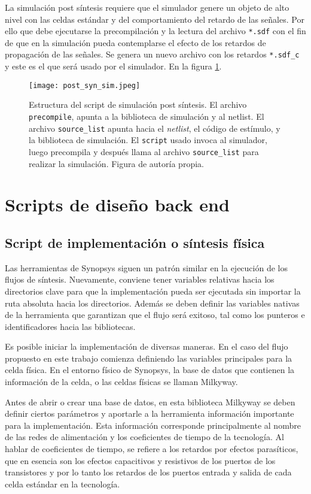 La simulación post síntesis requiere que el simulador genere un objeto de alto nivel con las celdas estándar y del comportamiento del retardo de las señales. Por ello que debe ejecutarse la precompilación y la lectura del archivo \texttt{*.sdf} con el fin de que en la simulación pueda contemplarse el efecto de los retardos de propagación de las señales. Se genera un nuevo archivo con los retardos \texttt{*.sdf\_c} y este es el que será usado por el simulador. En la figura \ref{psyn_sim}.

\begin{figure}[h]
\texttt{[image: post\_syn\_sim.jpeg]}
\centering
\caption{Estructura del script de simulación post síntesis. El archivo \texttt{precompile}, apunta a la biblioteca de simulación y al netlist. El archivo \texttt{source\_list} apunta hacia el \textit{netlist}, el código de estímulo, y la biblioteca de simulación. El \texttt{script} usado invoca al simulador, luego precompila y después llama al archivo \texttt{source\_list} para realizar la simulación. Figura de autoría propia.}
\label{psyn_sim}
\end{figure}

\section{Scripts de diseño back end}
\label{sec:phy_s}
\subsection{Script de implementación o síntesis física}
Las herramientas de Synopsys siguen un patrón similar en la ejecución de los flujos de síntesis. Nuevamente, conviene tener variables relativas hacia los directorios clave para que la implementación pueda ser ejecutada sin importar la ruta absoluta hacia los directorios. Además se deben definir las variables nativas de la herramienta que garantizan que el flujo será exitoso, tal como los punteros e identificadores hacia las bibliotecas.

Es posible iniciar la implementación de diversas maneras. En el caso del flujo propuesto en este trabajo comienza definiendo las variables principales para la celda física. En el entorno físico de Synopsys, la base de datos que contienen la información de la celda, o las celdas físicas se llaman Milkyway.

Antes de abrir o crear una base de datos, en esta biblioteca Milkyway se deben definir ciertos parámetros y aportarle a la herramienta información importante para la implementación. Esta información corresponde principalmente al nombre de las redes de alimentación y los coeficientes de tiempo de la tecnología. Al hablar de coeficientes de tiempo, se refiere a los retardos por efectos parasíticos, que en esencia son los efectos capacitivos y resistivos de los puertos de los transistores y por lo tanto los retardos de los puertos entrada y salida de cada celda estándar en la tecnología.

